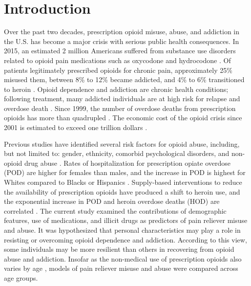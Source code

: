 \documentclass[sigconf]{acmart}
\begin{document}
\maketitle


\section{Introduction}

Over the past two decades, prescription opioid misuse, abuse, and addiction 
in the U.S. has become a major crisis with serious public health consequences.
In 2015, an estimated 2 million Americans suffered from substance use disorders 
related to opioid pain medications such as oxycodone and hydrocodone 
\cite{nida18,cdc18}. Of patients legitimately prescribed opioids for chronic 
pain, approximately 25\% misused them, between 8\% to 12\% became addicted, and 
4\% to 6\% transitioned to heroin \cite{vowles15, carlson16}. Opioid dependence 
and addiction are chronic health conditions; following treatment, many addicted 
individuals are at high risk for relapse and overdose death \cite{shaham03}. 
Since 1999, the number of overdose deaths from prescription opioids has more 
than quadrupled \cite{cdc16}. The economic cost of the opioid crisis since 2001 
is estimated to exceed one trillion dollars \cite{altarum18}. 

Previous studies have identified several risk factors for opioid abuse, 
including, but not limited to: gender, ethnicity, comorbid psychological 
disorders, and non-opioid drug abuse \cite{yokell13,rice12,zedler14}. Rates of 
hospitalization for prescription opiate overdose (POD) are higher for females 
than males, and the increase in POD is highest for Whites compared to Blacks or 
Hispanics \cite{unick13}. Supply-based interventions to reduce the availability 
of prescription opioids have produced a shift to heroin use, and the exponential 
increase in POD and heroin overdose deaths (HOD) are correlated 
\cite{jones15,reifler12}. The current study examined the contributions of 
demographic features, use of medications, and illicit drugs as predictors of 
pain reliever misuse and abuse. It was hypothesized that personal 
characteristics may play a role in resisting or overcoming opioid dependence 
and addiction. According to this view, some individuals may be more resilient 
than others in recovering from opioid abuse and addiction. Insofar as the 
non-medical use of prescription opioids also varies by age \cite{mccabe12}, 
models of pain reliever misuse and abuse were compared across age groups.
\end{document}
